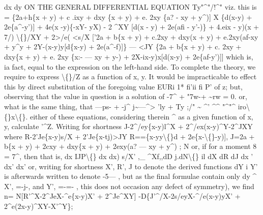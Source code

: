 \documentclass[11pt,a4paper]{book}
\begin{document}
dx
dy
ON THE GENERAL DIFFERENTIAL EQUATION Ty"\textasciicircum{}"/!\textasciicircum{}"
viz.
this
is
= \{2a+h\{x + y) + c .ixy + dxy \{x + y) + e. 2xy \{a? - xy + y\textasciicircum{})]
X \{d(x-y) + 2e\{a\textasciicircum{}-y')] + 4e(x -y)\{-xY- yX)
- 2 \textasciicircum{}XY [d(x - y) + 2e(afi - y'-)\} + 4.eix - y)(x + 7/) \textbackslash\{\}/XY
+ 2>/e(
<s/X ['2a + b\{x + y) + c.2xy + dxy(x + y) + e.2xy(af-xy + y\textasciicircum{}y
+ 2Y-(x-y)y[d\{x-y) + 2e(a\textasciicircum{}-f)]\}
--- <JY \{2a + b\{x + y) + c. 2xy + dxy\{x + y) + e. 2xy \{x:- --- xy + y-)
+ 2X-ix-y)x[d(x-y) + 2e\{af-y')]]
which
is,
ia
fact, equal to the expression on the
left-hand
side.
To
complete
the
theory,
we
require
to
express
\textbackslash\{\}/Z
as
a
function
of
x,
y.
It
would
be
impracticable
to
effect
this
by
direct
substitution
of
the
foregoing
value
EURi 1*
fi'ii
fi P'
of
z;
but,
observing
that
the
value
in
question
is
a
solution
of
-7\textasciicircum{} + "7w-+ \textasciitilde{}rw = 0.
or, what
is
the
same
thing, that
---ps- + -j\textasciicircum{} j\textasciitilde{}---\textasciicircum{}> 'ly + Ty ;/" \textasciitilde{} \textasciicircum{}'
\textasciicircum{}\textasciicircum{}\textregistered{}
"\textasciicircum{}"\textasciicircum{}
iro\textbackslash\{\}x\textbackslash\{\}.
either
of
these equations, considering therein \textasciicircum{} as a given function of x,
y,
calculate
'\textasciicircum{}Z.
Writing
for shortness
J-2\textasciicircum{}/ey\{x-y)l\textasciicircum{}X + 2\textasciicircum{}/ex(x-y)\textasciicircum{}Y-2\textasciicircum{}JXY
where
R-2'Je\{x-y)s/X + 2'Je\{x-tj)>JY
R==\{x-yy\textbackslash\{\}d + 2e\{x-\textbackslash\{\}-y)],
J=2a + b\{x + y) + 2cxy + dxy\{x + y) + 2exy(a? --- xy + y\textasciicircum{})
;
N
or,
if for a moment
8 = 7\textasciicircum{}, then
that
is,
dx
IJP\textbackslash\{\}
dx
dx)
s/X'
,\_
\textasciicircum{}Xf,,dD
j.dN\textbackslash\{\}
il
dX
dR
dJ
dx
'
dx'
dx'
or,
writing
for
shortness
X',
R', J
to
denote
the
derived
functions
dY
i Y'
is
afterwards
written
to
denote
-5---
,
but
as
the
final
formulae
contain
only
dy
\textasciicircum{}
X', =-j-, and
Y', =-=-
,
this does not occasion any defect of symmetry), we
find
n=
N[R'\textasciicircum{}X-2\textasciicircum{}JeX-\textasciicircum{}e\{x-y)X' + 2\textasciicircum{}Je\textasciicircum{}XY]
-D\{J'\textasciicircum{}/X-2s/eyX-\textasciicircum{}/e(x-y)yX' + 2\textasciicircum{}e(2x-y)\textasciicircum{}XY-X'\textasciicircum{}Y\};
\end{document}
